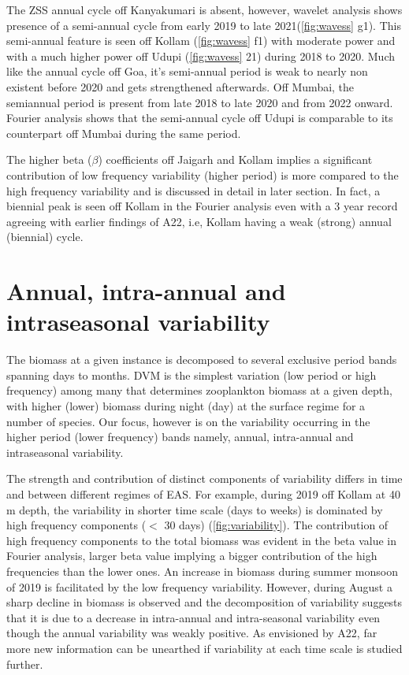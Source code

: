 \documentclass{article}
\begin{document}
	The ZSS annual cycle off Kanyakumari is absent, however, wavelet analysis shows presence of a semi-annual cycle from early 2019 to late 2021(\cref{fig:wavess} g1). This semi-annual feature is seen off Kollam (\cref{fig:wavess} f1) with moderate power and with a much higher power off Udupi (\cref{fig:wavess} 21) during 2018 to 2020. Much like the annual cycle off Goa, it's semi-annual period is weak to nearly non existent before 2020 and gets strengthened afterwards. Off Mumbai, the semiannual period is present from late 2018 to late 2020 and from 2022 onward. Fourier analysis shows that the semi-annual cycle off Udupi is comparable to its counterpart off Mumbai during the same period. 

	The higher beta ($\beta$) coefficients off Jaigarh and Kollam implies a significant contribution of low frequency variability (higher period) is more compared to the high frequency variability and is discussed in detail in later section. In fact, a biennial peak is seen off Kollam in the Fourier analysis even with a 3 year record agreeing with earlier findings of A22, i.e, Kollam having a weak (strong) annual (biennial) cycle. 


	\section{Annual, intra-annual and intraseasonal variability}
	\label{vari}
	The biomass at a given instance is decomposed to several exclusive period bands spanning days to months. DVM is the simplest variation (low period or high frequency) among many that determines zooplankton biomass at a given depth, with higher (lower) biomass during night (day) at the surface regime for a number of species. Our focus, however is on the variability occurring in the higher period (lower frequency) bands namely, annual, intra-annual and intraseasonal variability. 		
	
	The strength and contribution of distinct components of variability differs in time and between different regimes of EAS. For example, during 2019 off Kollam at 40 m depth, the variability in shorter time scale (days to weeks) is dominated by high frequency components ($<$ 30 days) (\cref{fig:variability}). The contribution of high frequency components to the total biomass was evident in the beta value in Fourier analysis, larger beta value implying a bigger contribution of the high frequencies	than the lower ones. An increase in biomass during summer monsoon of 2019 is facilitated by the low frequency variability. However, during August a sharp decline in biomass is observed and the decomposition of variability suggests that it is due to a decrease in intra-annual and intra-seasonal variability even though the annual variability was weakly positive. As envisioned by A22, far more new information can be unearthed if variability at each time scale is studied further. 
	
\end{document}
